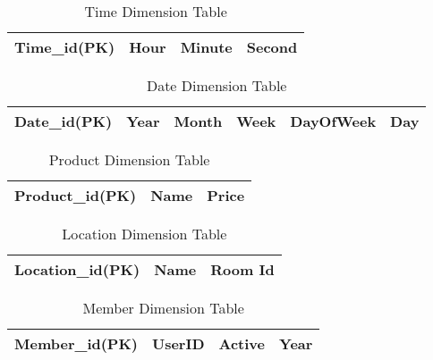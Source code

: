 \begin{table}[H]
    \centering
    \begin{tabular}{|l|l|l|l|}
        \hline
        Time\_id(PK) & Hour & Minute & Second \\ \hline
    \end{tabular}
    \caption{Time Dimension Table}
    \label{tab:timeDimensionTable}
\end{table}

\begin{table}[H]
    \centering
    \begin{tabular}{|l|l|l|l|l|l|}
        \hline
        Date\_id(PK) & Year & Month & Week & DayOfWeek & Day \\ \hline
    \end{tabular}
    \caption{Date Dimension Table}
    \label{tab:dateDimensionTable}
\end{table}

\begin{table}[H]
    \centering
    \begin{tabular}{|l|l|l|}
        \hline
        Product\_id(PK) & Name & Price \\ \hline
    \end{tabular}
    \caption{Product Dimension Table}
    \label{tab:productDimensionTable}
\end{table}

\begin{table}[H]
    \centering
    \begin{tabular}{|l|l|l|}
        \hline
        Location\_id(PK) & Name & Room Id \\ \hline
    \end{tabular}
    \caption{Location Dimension Table}
    \label{tab:locationDimensionTable}
\end{table}

\begin{table}[H]
    \centering
    \begin{tabular}{|l|l|l|l|}
        \hline
        Member\_id(PK) & UserID & Active & Year \\ \hline
    \end{tabular}
    \caption{Member Dimension Table}
    \label{tab:memberDimensionTable}
\end{table}
